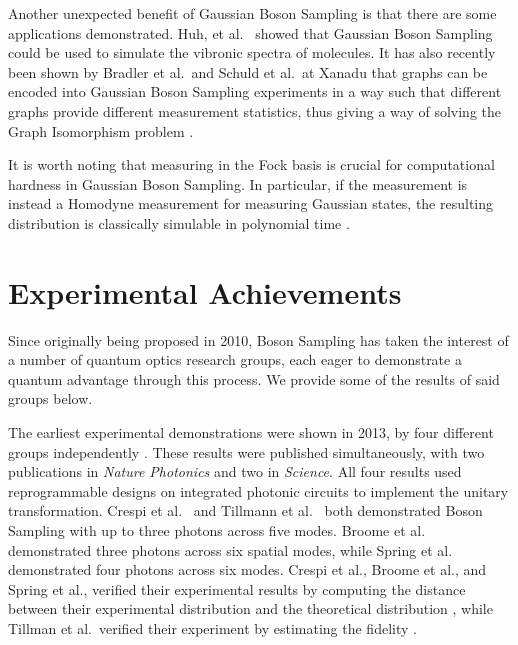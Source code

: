 Another unexpected benefit of Gaussian Boson Sampling is that there are some applications demonstrated. Huh, et al.~\cite{huh2015} showed that Gaussian Boson Sampling could be used to simulate the vibronic spectra of molecules. It has also recently been shown by Bradler et al.\ and Schuld et al.\ at Xanadu that graphs can be encoded into Gaussian Boson Sampling experiments in a way such that different graphs provide different measurement statistics, thus giving a way of solving the Graph Isomorphism problem \cite{bradler2018, schuld2019}.

It is worth noting that measuring in the Fock basis is crucial for computational hardness in Gaussian Boson Sampling. In particular, if the measurement is instead a Homodyne measurement for measuring Gaussian states, the resulting distribution is classically simulable in polynomial time \cite{bartlett2003}.

\section{Experimental Achievements}
\label{sec:experimental-achievements}

Since originally being proposed in 2010, Boson Sampling has taken the interest of a number of quantum optics research groups, each eager to demonstrate a quantum advantage through this process. We provide some of the results of said groups below.

The earliest experimental demonstrations were shown in 2013, by four different groups independently \cite{broome2013, spring2013, tillmann2013, crespi2013}. These results were published simultaneously, with two publications in \emph{Nature Photonics} and two in \emph{Science}. All four results used reprogrammable designs on integrated photonic circuits to implement the unitary transformation. Crespi et al.~\cite{crespi2013} and Tillmann et al.~\cite{tillmann2013} both demonstrated Boson Sampling with up to three photons across five modes. Broome et al.~\cite{broome2013} demonstrated three photons across six spatial modes, while Spring et al.~\cite{spring2013} demonstrated four photons across six modes. Crespi et al., Broome et al., and Spring et al., verified their experimental results by computing the distance between their experimental distribution and the theoretical distribution \cite{spring2013, tillmann2013, crespi2013}, while Tillman et al.\ verified their experiment by estimating the fidelity \cite{tillmann2013}.

